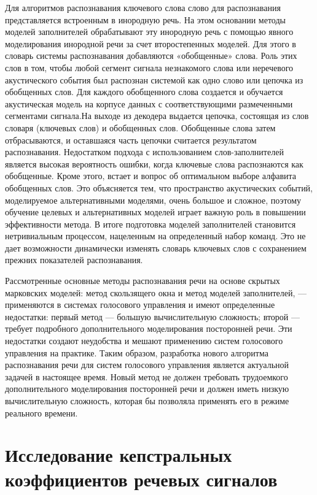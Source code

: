 \documentclass[a4paper,14pt,russian,utf8,nocolumnsxix,nocolumnxxxi,nocolumnxxxii]{eskdtext}
\begin{document}
Для алгоритмов распознавания ключевого слова слово для распознавания представляется встроенным в инородную речь. На этом основании методы моделей заполнителей \cite{higgins} обрабатывают эту инородную речь с помощью явного моделирования инородной речи за счет второстепенных моделей. Для этого в словарь системы распознавания добавляются «обобщенные» слова. Роль этих слов в том, чтобы любой сегмент сигнала незнакомого слова или неречевого акустического события был распознан системой как одно слово или цепочка
из обобщенных слов. Для каждого обобщенного слова создается и обучается акустическая модель на корпусе данных с соответствующими размеченными сегментами сигнала.На выходе из декодера выдается цепочка, состоящая из слов словаря (ключевых слов) и обобщенных слов. Обобщенные слова затем отбрасываются, и оставшаяся часть цепочки считается результатом распознавания.
Недостатком подхода с использованием слов-заполнителей является высокая вероятность ошибки, когда ключевые слова распознаются как обобщенные. Кроме этого, встает и вопрос об оптимальном выборе алфавита обобщенных слов. Это объясняется тем, что пространство акустических событий, моделируемое альтернативными моделями, очень большое и сложное, поэтому обучение целевых и альтернативных моделей играет важную роль в повышении эффективности метода. В итоге подготовка моделей заполнителей становится нетривиальным процессом, нацеленным на определенный набор команд. Это не дает возможности динамически изменять словарь ключевых слов с сохранением прежних показателей распознавания.\cite{grebnov}

Рассмотренные основные методы распознавания речи на основе скрытых марковских моделей: метод скользящего окна и метод
моделей заполнителей, --- применяются в системах голосового управления и имеют определенные недостатки: первый метод --- большую
вычислительную сложность; второй --- требует подробного дополнительного моделирования посторонней речи. Эти недостатки создают неудобства и мешают применению систем голосового управления на практике. Таким образом, разработка нового алгоритма распознавания речи для систем голосового управления является актуальной задачей в настоящее время. Новый метод не должен требовать трудоемкого дополнительного моделирования посторонней речи и должен иметь низкую вычислительную сложность, которая бы позволяла применять его в режиме реального времени.

\pagebreak

\section[Исследование кепстральных коэффициентов \\ речевых сигналов]{Исследование кепстральных\\ коэффициентов речевых сигналов}
\setcounter{figure}{0} 
\end{document}
